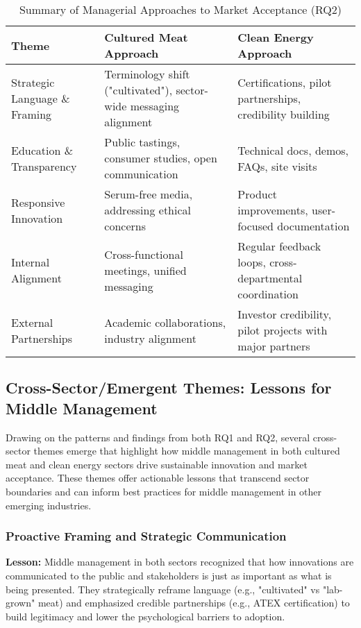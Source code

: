 \begin{table}[h!]
	\centering
	\caption{Summary of Managerial Approaches to Market Acceptance (RQ2)}
	\label{tab:rq2_summary}
	\begin{tabularx}{\textwidth}{@{}lXX@{}}
		\toprule
		\textbf{Theme} & \textbf{Cultured Meat Approach} & \textbf{Clean Energy Approach} \\
		\midrule
		Strategic Language \& Framing & Terminology shift ("cultivated"), sector-wide messaging alignment & Certifications, pilot partnerships, credibility building \\
		\addlinespace
		Education \& Transparency & Public tastings, consumer studies, open communication & Technical docs, demos, FAQs, site visits \\
		\addlinespace
		Responsive Innovation & Serum-free media, addressing ethical concerns & Product improvements, user-focused documentation \\
		\addlinespace
		Internal Alignment & Cross-functional meetings, unified messaging & Regular feedback loops, cross-departmental coordination \\
		\addlinespace
		External Partnerships & Academic collaborations, industry alignment & Investor credibility, pilot projects with major partners \\
		\bottomrule
	\end{tabularx}
\end{table}

\subsection{Cross-Sector/Emergent Themes: Lessons for Middle Management}
Drawing on the patterns and findings from both RQ1 and RQ2, several cross-sector themes emerge that highlight how middle management in both cultured meat and clean energy sectors drive sustainable innovation and market acceptance. These themes offer actionable lessons that transcend sector boundaries and can inform best practices for middle management in other emerging industries.

\subsubsection{Proactive Framing and Strategic Communication}
\noindent\textbf{Lesson:} Middle management in both sectors recognized that how innovations are communicated to the public and stakeholders is just as important as what is being presented. They strategically reframe language (e.g., "cultivated" vs "lab-grown" meat) and emphasized credible partnerships (e.g., ATEX certification) to build legitimacy and lower the psychological barriers to adoption.

